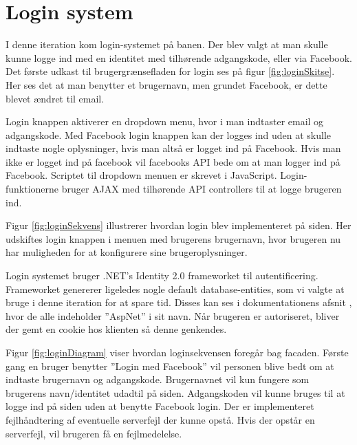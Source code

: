 \section{Login system}
\label{sec:LoginIT2}

I denne iteration kom login-systemet på banen. Der blev valgt at man skulle kunne logge ind med en identitet med tilhørende adgangskode, eller via Facebook. Det første udkast til brugergrænsefladen for login ses på figur \ref{fig:loginSkitse}. Her ses det at man benytter et brugernavn, men grundet Facebook, er dette blevet ændret til email.


Login knappen aktiverer en dropdown menu, hvor i man indtaster email og adgangskode. Med Facebook login knappen kan der logges ind uden at skulle indtaste nogle oplysninger, hvis man altså er logget ind på Facebook. Hvis man ikke er logget ind på facebook vil facebooks API bede om at man logger ind på Facebook. Scriptet til dropdown menuen er skrevet i JavaScript. Login-funktionerne bruger AJAX med tilhørende API controllers til at logge brugeren ind.


Figur \ref{fig:loginSekvens} illustrerer hvordan login blev implementeret på siden. Her udskiftes login knappen i menuen med brugerens brugernavn, hvor brugeren nu har muligheden for at konfigurere sine brugeroplysninger. 

Login systemet bruger .NET's Identity 2.0 frameworket til autentificering. Frameworket genererer ligeledes nogle default database-entities, som vi valgte at bruge i denne iteration for at spare tid. Disses kan ses i dokumentationens afsnit , hvor de alle indeholder ''AspNet'' i sit navn.  Når brugeren er autoriseret, bliver der gemt en cookie hos klienten så denne genkendes.



Figur \ref{fig:loginDiagram} viser hvordan loginsekvensen foregår bag facaden. Første gang en bruger benytter ''Login med Facebook'' vil personen blive bedt om at indtaste brugernavn og adgangskode. Brugernavnet vil kun fungere som brugerens navn/identitet udadtil på siden. Adgangskoden vil kunne bruges til at logge ind på siden uden at benytte Facebook login. Der er implementeret fejlhåndtering af eventuelle serverfejl der kunne opstå. Hvis der opstår en serverfejl, vil brugeren få en fejlmedelelse.

